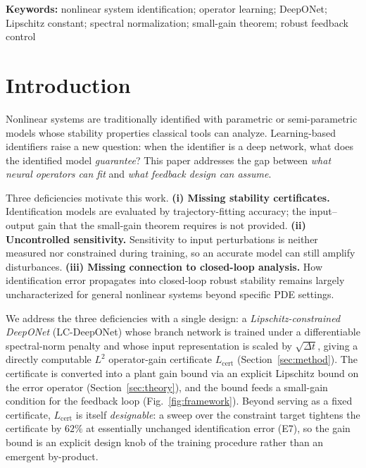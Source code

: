 \documentclass[11pt]{article}
\newcommand{\Ltwo}{L^2}
\newcommand{\Lhat}{L_{\mathrm{cert}}}
\begin{document}
\medskip
\noindent\textbf{Keywords:} nonlinear system identification; operator
learning; DeepONet; Lipschitz constant; spectral normalization; small-gain
theorem; robust feedback control

\section{Introduction}\label{sec:intro}

Nonlinear systems are traditionally identified with parametric or
semi-parametric models whose stability properties classical tools can
analyze. Learning-based identifiers raise a new question: when the identifier
is a deep network, what does the identified model \emph{guarantee}? This paper
addresses the gap between \emph{what neural operators can fit} and \emph{what
feedback design can assume}.

Three deficiencies motivate this work.
\textbf{(i) Missing stability certificates.} Identification models are
evaluated by trajectory-fitting accuracy; the input--output gain that the
small-gain theorem requires is not provided.
\textbf{(ii) Uncontrolled sensitivity.} Sensitivity to input perturbations is
neither measured nor constrained during training, so an accurate model can
still amplify disturbances.
\textbf{(iii) Missing connection to closed-loop analysis.} How identification
error propagates into closed-loop robust stability remains largely
uncharacterized for general nonlinear systems beyond specific PDE settings.


We address the three deficiencies with a single design: a
\emph{Lipschitz-constrained DeepONet} (LC-DeepONet) whose branch network is
trained under a differentiable spectral-norm penalty and whose input
representation is scaled by
$\sqrt{\Delta t}$, giving a directly computable $\Ltwo$ operator-gain
certificate $\Lhat$ (Section~\ref{sec:method}). The certificate is converted
into a plant gain bound via an explicit Lipschitz bound on the error operator
(Section~\ref{sec:theory}), and the bound feeds a small-gain condition for the
feedback loop (Fig.~\ref{fig:framework}). Beyond serving as a fixed
certificate, $\Lhat$ is itself \emph{designable}: a sweep over the constraint
target tightens the certificate by $62\%$ at essentially unchanged
identification error (E7), so the gain bound is an explicit design knob of
the training procedure rather than an emergent by-product.
\end{document}
